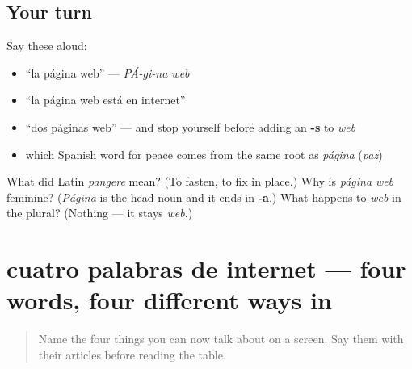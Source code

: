 \subsection*{Your turn}
Say these aloud:

\begin{itemize}
\raggedright
  \item \textquotedblleft{}la página web\textquotedblright{} — \emph{PÁ-gi-na web}
  \item \textquotedblleft{}la página web está en internet\textquotedblright{}
  \item \textquotedblleft{}dos páginas web\textquotedblright{} — and stop yourself before adding an \textbf{-s} to \emph{web}
  \item which Spanish word for peace comes from the same root as \emph{página} (\emph{paz})
\end{itemize}

\begin{tcolorbox}[breakable,colback=teal!4,colframe=teal!35!black,title={Before you move on}]
What did Latin \emph{pangere} mean? (To fasten, to fix in place.) Why is \emph{página web} feminine? (\emph{Página} is the head noun and it ends in \textbf{-a}.) What happens to \emph{web} in the plural? (Nothing — it stays \emph{web}.)
\end{tcolorbox}
\section[cuatro palabras de internet]{cuatro palabras de internet — four words, four different ways in}

\label{lesson:ES-C422-repaso-red}



\begin{quote}
Name the four things you can now talk about on a screen. Say them with their articles before reading the table.
\end{quote}

